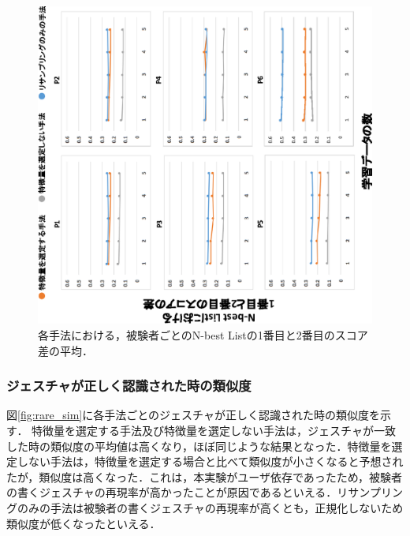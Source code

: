 \begin{figure}[!h]
\centering
\includegraphics[width=0.85\columnwidth,angle=-90]{img/pre_diff.eps}
\caption{各手法における，被験者ごとのN-best Listの1番目と2番目のスコア差の平均．}
\label{fig:rare_diff}
\end{figure}

\subsubsection{ジェスチャが正しく認識された時の類似度}
図\ref{fig:rare_sim}に各手法ごとのジェスチャが正しく認識された時の類似度を示す．
特徴量を選定する手法及び特徴量を選定しない手法は，ジェスチャが一致した時の類似度の平均値は高くなり，ほぼ同じような結果となった．特徴量を選定しない手法は，特徴量を選定する場合と比べて類似度が小さくなると予想されたが，類似度は高くなった．これは，本実験がユーザ依存であったため，被験者の書くジェスチャの再現率が高かったことが原因であるといえる．リサンプリングのみの手法は被験者の書くジェスチャの再現率が高くとも，正規化しないため類似度が低くなったといえる．


